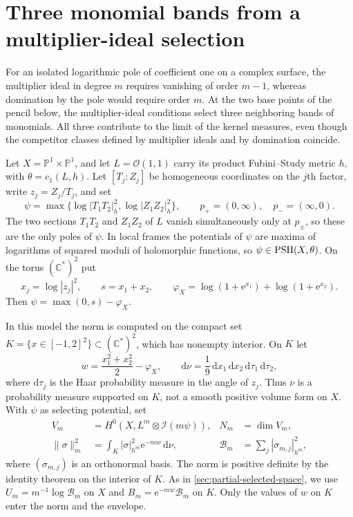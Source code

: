 \section{Three monomial bands from a multiplier-ideal selection}
\label{sec:pencil-ideal-kernels}

For an isolated logarithmic pole of coefficient one on a complex surface, the multiplier ideal in degree $m$ requires vanishing of order $m-1$, whereas domination by the pole would require order $m$. At the two base points of the pencil below, the multiplier-ideal conditions select three neighboring bands of monomials. All three contribute to the limit of the kernel measures, even though the competitor classes defined by multiplier ideals and by domination coincide.

Let $X=\mathbb P^1\times\mathbb P^1$, and let $L=\mathcal O(1,1)$ carry its product Fubini--Study metric $h$, with $\theta=c_1(L,h)$. Let $[T_j:Z_j]$ be homogeneous coordinates on the $j$th factor, write $z_j=Z_j/T_j$, and set
\[
 \psi=\max\{\log|T_1T_2|_h^2,\log|Z_1Z_2|_h^2\},
 \qquad p_+=(0,\infty),\quad p_-=(\infty,0).
\]
The two sections $T_1T_2$ and $Z_1Z_2$ of $L$ vanish simultaneously only at $p_\pm$, so these are the only poles of $\psi$. In local frames the potentials of $\psi$ are maxima of logarithms of squared moduli of holomorphic functions, so $\psi\in\mathrm{PSH}(X,\theta)$. On the torus $(\mathbb C^*)^2$ put
\[
 x_j=\log|z_j|^2,\qquad s=x_1+x_2,\qquad
 \varphi_X=\log(1+\mathrm e^{x_1})+\log(1+\mathrm e^{x_2}).
\]
Then $\psi=\max(0,s)-\varphi_X$.

In this model the norm is computed on the compact set $K=\{x\in[-1,2]^2\}\subset(\mathbb C^*)^2$, which has nonempty interior. On $K$ let
\[
 w=\frac{x_1^2+x_2^2}{2}-\varphi_X,
 \qquad \mathrm d\nu=\frac19\,\mathrm dx_1\,\mathrm dx_2\,\mathrm d\tau_1\,\mathrm d\tau_2,
\]
where $\mathrm d\tau_j$ is the Haar probability measure in the angle of $z_j$. Thus $\nu$ is a probability measure supported on $K$, not a smooth positive volume form on $X$. With $\psi$ as selecting potential, set
\[
 \begin{aligned}
 V_m&=H^0(X,L^m\otimes\mathcal I(m\psi)),
 &N_m&=\dim V_m,\\
 \|\sigma\|_m^2&=\int_K|\sigma|_{h^m}^2\mathrm e^{-mw}\,\mathrm d\nu,
 &\mathcal B_m&=\sum_j|\sigma_{m,j}|_{h^m}^2,
 \end{aligned}
\]
where $(\sigma_{m,j})$ is an orthonormal basis. The norm is positive definite by the identity theorem on the interior of $K$. As in \cref{sec:partial-selected-space}, we use $U_m=m^{-1}\log\mathcal B_m$ on $X$ and $B_m=\mathrm e^{-mw}\mathcal B_m$ on $K$. Only the values of $w$ on $K$ enter the norm and the envelope.

